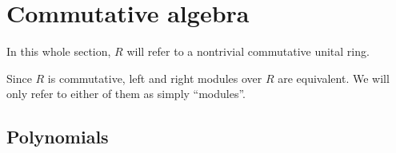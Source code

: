\section{Commutative algebra}\label{sec:commutative_algebra}

\begin{remark}\label{remark:polynomial_commutative_ring}
  In this whole section, \( R \) will refer to a nontrivial commutative unital ring.

  Since \( R \) is commutative, left and right modules over \( R \) are equivalent. We will only refer to either of them as simply \enquote{modules}.
\end{remark}

\subsection{Polynomials}\label{subsec:polynomials}

